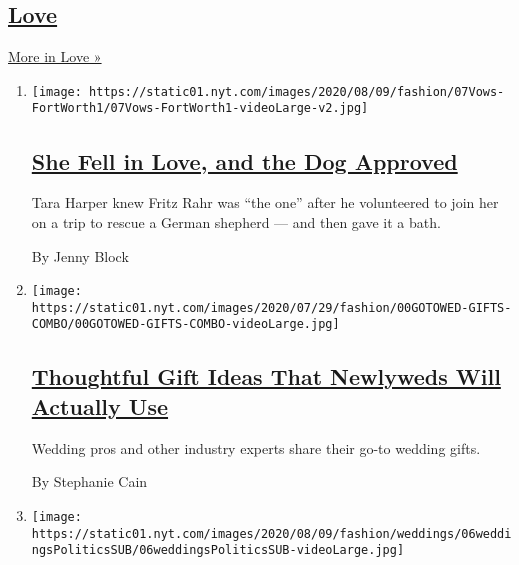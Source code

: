 \hypertarget{love}{%
\subsection{\texorpdfstring{\href{/section/fashion/weddings}{Love}}{Love}}\label{love}}

\href{/section/fashion/weddings}{More in Love »}

\begin{enumerate}
\def\labelenumi{\arabic{enumi}.}
\item
  \texttt{[image: https://static01.nyt.com/images/2020/08/09/fashion/07Vows-FortWorth1/07Vows-FortWorth1-videoLarge-v2.jpg]}

  \hypertarget{she-fell-in-love-and-the-dog-approved}{%
  \subsection{\texorpdfstring{\href{/2020/08/07/fashion/weddings/Tara-Harper-and-Fritz-Rahr-Fort-Worth-wedding.html}{She
  Fell in Love, and the Dog
  Approved}}{She Fell in Love, and the Dog Approved}}\label{she-fell-in-love-and-the-dog-approved}}

  Tara Harper knew Fritz Rahr was ``the one'' after he volunteered to
  join her on a trip to rescue a German shepherd --- and then gave it a
  bath.

  By Jenny Block
\item
  \texttt{[image: https://static01.nyt.com/images/2020/07/29/fashion/00GOTOWED-GIFTS-COMBO/00GOTOWED-GIFTS-COMBO-videoLarge.jpg]}

  \hypertarget{thoughtful-gift-ideas-that-newlyweds-will-actually-use-1}{%
  \subsection{\texorpdfstring{\href{/2020/08/08/fashion/weddings/thoughtful-gift-ideas-that-newlyweds-will-actually-use.html}{Thoughtful
  Gift Ideas That Newlyweds Will Actually
  Use}}{Thoughtful Gift Ideas That Newlyweds Will Actually Use}}\label{thoughtful-gift-ideas-that-newlyweds-will-actually-use-1}}

  Wedding pros and other industry experts share their go-to wedding
  gifts.

  By Stephanie Cain
\item
  \texttt{[image: https://static01.nyt.com/images/2020/08/09/fashion/weddings/06weddingsPoliticsSUB/06weddingsPoliticsSUB-videoLarge.jpg]}

  \hypertarget{some-wedding-vendors-face-fallout-after-speaking-up-on-social-issues}{%
}
\end{enumerate}
